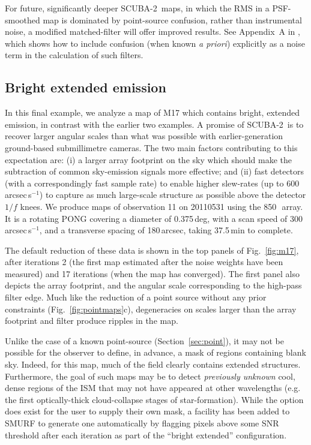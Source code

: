 \documentclass[useAMS,usenatbib,nofootinbib]{mn2e}
\newcommand{\scuba}{SCUBA-2}
\begin{document}
For future, significantly deeper \scuba\ maps, in which the RMS in a
PSF-smoothed map is dominated by point-source confusion, rather than
instrumental noise, a modified matched-filter will offer improved
results. See Appendix~A in \citet{chapin2011}, which shows how to
include confusion (when known \emph{a priori}) explicitly as a noise
term in the calculation of such filters.

\subsection{Bright extended emission}
\label{sec:extended}

In this final example, we analyze a map of M17 which contains bright,
extended emission, in contrast with the earlier two examples. A
promise of \scuba\ is to recover larger angular scales than what was
possible with earlier-generation ground-based submillimetre
cameras. The two main factors contributing to this expectation are:
(i) a larger array footprint on the sky which should make the
subtraction of common sky-emission signals more effective; and (ii)
fast detectors (with a correspondingly fast sample rate) to enable
higher slew-rates (up to 600\,arcsec\,s$^{-1}$) to capture as much
large-scale structure as possible above the detector $1/f$ knees. We
produce maps of observation 11 on 20110531 using the 850\,\micron\
array. It is a rotating PONG covering a diameter of 0.375\,deg, with a
scan speed of 300\,arcsec\,s$^{-1}$, and a transverse spacing of
180\,arcsec, taking 37.5\,min to complete.

The default reduction of these data is shown in the top panels of
Fig.~\ref{fig:m17}, after iterations 2 (the first map estimated after
the noise weights have been measured) and 17 iterations (when the map
has converged). The first panel also depicts the array footprint, and
the angular scale corresponding to the high-pass filter edge. Much
like the reduction of a point source without any prior constraints
(Fig.~\ref{fig:pointmaps}c), degeneracies on scales larger than the
array footprint and filter produce ripples in the map.

Unlike the case of a known point-source (Section~\ref{sec:point}), it
may not be possible for the observer to define, in advance, a mask of
regions containing blank sky. Indeed, for this map, much of the field
clearly contains extended structures. Furthermore, the goal of such
maps may be to detect \emph{previously unknown} cool, dense regions of
the ISM that may not have appeared at other wavelengths (e.g. the
first optically-thick cloud-collapse stages of star-formation). While
the option does exist for the user to supply their own mask, a
facility has been added to SMURF to generate one automatically by
flagging pixels above some SNR threshold after each iteration as part
of the ``bright extended'' configuration.
\end{document}
